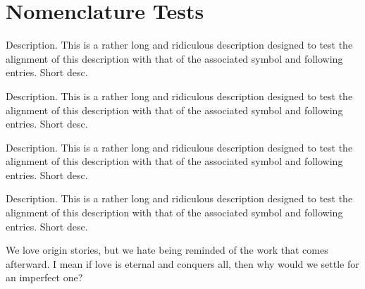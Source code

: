 
\chapter{Nomenclature Tests}

\MakeNomenclatureNotStarred
{}
\begin{Nomenclature}[section]
      {Description. This is a rather long and ridiculous description designed to test the alignment of 
                 this description with that of the associated symbol and following entries.}
        {Short desc.}   
    
          { Description. This is a rather long and ridiculous description designed to test the alignment of 
                        this description with that of the associated symbol and following entries.}
            {Short desc.}   
        
        
              { Description. This is a rather long and ridiculous description designed to test the alignment of 
                            this description with that of the associated symbol and following entries.}
                {Short desc.}


          { Description. This is a rather long and ridiculous description designed to test the alignment of 
                        this description with that of the associated symbol and following entries.}
            {Short desc.}

\end{Nomenclature}



We love origin stories, but we hate being reminded of the work that comes afterward.
I mean if love is eternal and conquers all, then why would we settle for an imperfect one?